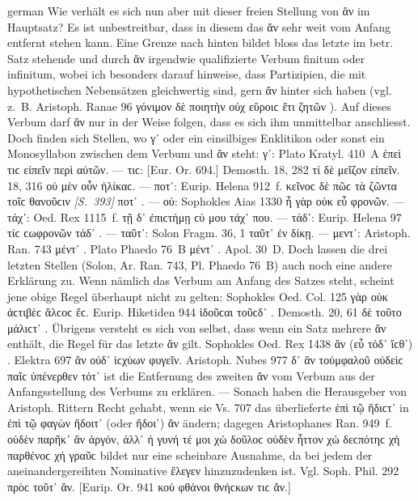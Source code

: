 \begin{otherlanguage*}{german}
Wie verhält es sich nun aber mit dieser freien Stellung von ἄν im Hauptsatz? Es ist unbestreitbar, dass in diesem das ἄν sehr weit vom Anfang entfernt stehen kann. Eine Grenze nach hinten bildet bloss das letzte im betr. Satz stehende und durch ἄν irgendwie qualifizierte Verbum finitum oder infinitum, wobei ich besonders darauf hinweise, dass Partizipien, die mit hypothetischen Nebensätzen gleichwertig sind, gern ἄν  hinter sich haben (vgl. z.~B. Aristoph. Ranae 96 γόνιμον δὲ ποιητὴν  οὐχ εὕροιϲ ἔτι ζητῶν ). Auf dieses Verbum darf ἄν nur in der Weise folgen, dass es sich ihm unmittelbar anschliesst. Doch finden sich Stellen, wo γ᾽ oder ein einsilbiges Enklitikon oder sonst ein Monosyllabon zwischen dem Verbum und ἄν steht: γ᾽: Plato Kratyl. 410~A ἐπεὶ  τιϲ εἰπεῖν περὶ αὐτῶν. — τιϲ: [Eur. Or. 694.] Demosth. 18, 282 τί δὲ μεῖζον  εἰπεῖν. 18, 316 οὐ μὲν οὖν  ἡλίκαϲ. — ποτ᾽: Eurip. Helena 912~f. κεῖνοϲ δὲ πῶϲ τὰ ζῶντα τοῖϲ θανοῦϲιν \hypertarget{p393}{\emph{[S.~393]}}\label{p393} ποτ᾽ . — οὐ: Sophokles Aias 1330 ἦ γὰρ  οὐκ  εὖ φρονῶν. — τάχ᾽: Oed. Rex 1115~f. τῇ δ᾽ ἐπιϲτήμῃ ϲύ μου  τάχ᾽  που. — τάδ᾽: Eurip. Helena 97 τίϲ ϲωφρονῶν  τάδ᾽ . — ταῦτ᾽: Solon Fragm. 36, 1  ταῦτ᾽  ἐν δίκῃ. — μεντ᾽: Aristoph. Ran. 743  μέντ᾽ . Plato Phaedo 76~Β  μέντ᾽ . Apol. 30~D. Doch lassen die drei letzten Stellen (Solon, Ar. Ran. 743, Pl. Phaedo 76~B) auch noch eine andere Erklärung zu. Wenn nämlich das Verbum am Anfang des Satzes steht, scheint jene obige Regel überhaupt nicht zu gelten: Sophokles Oed. Col. 125  γὰρ οὐκ  ἀϲτιβὲϲ ἄλϲοϲ ἔϲ. Eurip. Hiketiden 944  ἰδοῦϲαι τοῦϲδ᾽ . Demosth. 20, 61  δὲ τοῦτο μάλιϲτ᾽ . Übrigens versteht es sich von selbst, dass wenn ein Satz mehrere ἄν enthält, die Regel für das letzte ἄν gilt. Sophokles Oed. Rex 1438  ἂν (εὖ τόδ᾽ ἴϲθ᾽) . Elektra 697  ἂν ούδ᾽  ἰϲχύων φυγεῖν. Aristoph. Nubes 977  δ᾽ ἂν τοὐμφαλοῦ οὐδεὶϲ παῖϲ ὑπένερθεν τότ᾽  ist die Entfernung des zweiten ἄν vom Verbum aus der Anfangsstellung des Verbums zu erklären. — Sonach haben die Herausgeber von Aristoph. Rittern Recht gehabt, wenn sie Vs. 707 das überlieferte ἐπὶ τῷ  ἥδιϲτ᾽  in ἐπὶ τῷ φαγὼν ἥδοιτ᾽ (oder ἥδοι᾽) ἄν ändern; dagegen Aristophanes Ran. 949~f. οὐδὲν παρῆκ᾽ ἂν ἀργόν, ἀλλ᾽  ἡ γυνή τέ μοι χὠ δοῦλοϲ οὐδὲν ἧττον χὠ δεϲπότηϲ χἠ παρθένοϲ χἠ γραῦϲ  bildet nur eine scheinbare Ausnahme, da bei jedem der aneinandergereihten Nominative ἔλεγεν hinzuzudenken ist. Vgl. Soph. Phil. 292 πρὸϲ τοῦτ᾽ ἄν. [Eurip. Or. 941 κοὐ φθάνοι θνήϲκων τιϲ ἄν.]


\end{otherlanguage*}
